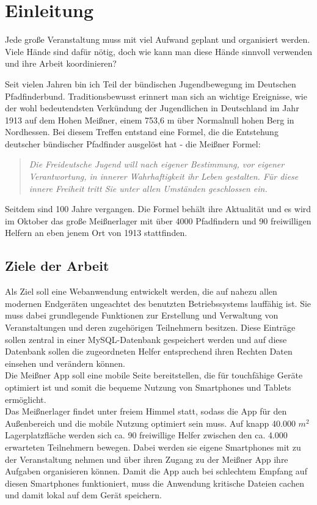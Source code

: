 \chapter{Einleitung}
Jede große Veranstaltung muss mit viel Aufwand geplant und organisiert werden. Viele Hände sind dafür nötig, doch wie kann man diese Hände sinnvoll verwenden und ihre Arbeit koordinieren?\par

Seit vielen Jahren bin ich Teil der bündischen Jugendbewegung im Deutschen Pfadfinderbund. Traditionsbewusst erinnert man sich an wichtige Ereignisse, wie der wohl bedeutendsten Verkündung der Jugendlichen in Deutschland im Jahr 1913 auf dem Hohen Meißner, einem 753,6 m über Normalnull hohen Berg in Nordhessen. Bei diesem Treffen entstand eine Formel, die die Entstehung deutscher bündischer Pfadfinder ausgelöst hat - die Meißner Formel:
\begin{quote}
	\textit{\glqq Die Freideutsche Jugend will nach eigener Bestimmung, vor eigener Verantwortung, in innerer Wahrhaftigkeit ihr Leben gestalten. Für diese innere Freiheit tritt Sie unter allen Umständen geschlossen ein.\grqq{}}\cite[S. 109]{meissnerformel}
\end{quote}
Seitdem sind 100 Jahre vergangen. Die Formel behält ihre Aktualität und es wird im Oktober das große Meißnerlager mit über 4000 Pfadfindern und 90 freiwilligen Helfern an eben jenem Ort von 1913 stattfinden.

\section{Ziele der Arbeit}
Als Ziel soll eine Webanwendung entwickelt werden, die auf nahezu allen modernen Endgeräten ungeachtet des benutzten Betriebssystems lauffähig ist. Sie muss dabei grundlegende Funktionen zur Erstellung und Verwaltung von Veranstaltungen und deren zugehörigen Teilnehmern besitzen. Diese Einträge sollen zentral in einer MySQL-Datenbank gespeichert werden und auf diese Datenbank sollen die zugeordneten Helfer entsprechend ihren Rechten Daten einsehen und verändern können.\\
Die Meißner App soll eine mobile Seite bereitstellen, die für touchfähige Geräte optimiert ist und somit die bequeme Nutzung von Smartphones und Tablets ermöglicht.\\
Das Meißnerlager findet unter freiem Himmel statt, sodass die App für den Außenbereich und die mobile Nutzung optimiert sein muss. Auf knapp 40.000 $m^2$ Lagerplatzfläche werden sich ca. 90 freiwillige Helfer zwischen den ca. 4.000 erwarteten Teilnehmern bewegen. Dabei werden sie eigene Smartphones mit zu der Veranstaltung nehmen und über ihren Zugang zu der Meißner App ihre Aufgaben organisieren können. Damit die App auch bei schlechtem Empfang auf diesen Smartphones funktioniert, muss die Anwendung kritische Dateien cachen und damit lokal auf dem Gerät speichern.\par


